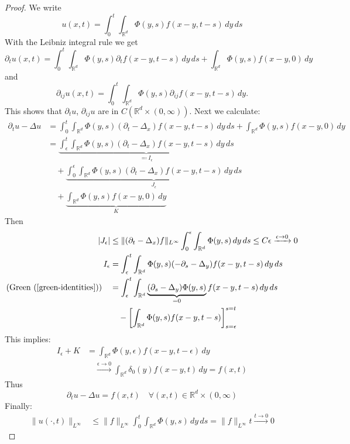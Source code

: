 \documentclass{report}
\theoremstyle{tommy}
\begin{document}
  \begin{proof}
    We write
    \[
      u(x,t) = \int_0^t \int_{\mathbb{R}^d} \Phi(y,s) f(x-y, t-s) \, dy \, ds
    \]
    With the Leibniz integral rule we get
    \[
      \partial_t u(x,t) = \int_0^t \int_{\mathbb{R}^d} \Phi(y,s) \partial_t f(x-y,t-s) \, dy \, ds + \int_{\mathbb{R}^d} \Phi(y,s) f(x-y, 0) \, dy
    \]
    and 
    \[\partial_{ij} u(x,t) = \int_0^t \int_{\mathbb{R}^d} \Phi(y,s) \partial_{ij} f(x-y, t-s) \, dy.\]
    This shows that \(\partial_t u\), \(\partial_{ij} u\) are in \(C(\mathbb{R}^d \times (0, \infty))\). Next we calculate:
    \begin{align*}
      \partial_t u - \Delta u
      &= \int_0^t \int_{\mathbb{R}^d} \Phi(y,s) (\partial_t - \Delta_x) f(x-y, t-s) \, dy \, ds + \int_{\mathbb{R}^d} \Phi(y,s) f(x-y, 0) \, dy \\
      &= \underbrace{\int_\epsilon^t \int_{\mathbb{R}^d} \Phi(y,s) (\partial_t - \Delta_x) f(x-y, t-s) \, dy \, ds}_{\eqqcolon I_\epsilon} \\
      &\quad+ \underbrace{\int_0^\epsilon \int_{\mathbb{R}^d} \Phi(y,s) (\partial_t - \Delta_x) f(x-y, t-s) \, dy \, ds}_{J_\epsilon} \\ 
      &\quad+ \underbrace{\int_{\mathbb{R}^d} \Phi(y,s) f(x-y,0) \, dy}_K
    \end{align*}
    Then
    \begin{align*}
      |J_\epsilon| &\le \|(\partial_t - \Delta_x) f\|_{L^\infty} \int_0^\epsilon \int_{\mathbb{R}^d} \Phi(y,s) \, dy \, ds \le C \epsilon \xrightarrow{\epsilon \to 0} 0 \\
      I_\epsilon &= \int_\epsilon^t \int_{\mathbb{R}^d} \Phi(y,s) (-\partial_s - \Delta_y) f(x-y,t-s) \, dy \, ds \\
      \text{(Green (\ref{green-identities}))}\quad &= \int_{\epsilon}^t \int_{\mathbb{R}^d} \underbrace{(\partial_s - \Delta_y) \Phi(y,s)}_{= 0} f(x-y, t-s) \, dy \, ds \\
      &\quad - \left[\int_{\mathbb{R}^d} \Phi(y,s) f(x-y, t-s)\right]_{s=\epsilon}^{s=t}
    \end{align*}
    This implies:
    \begin{align*}
      I_\epsilon + K 
      &= \int_{\mathbb{R}^d} \Phi(y,\epsilon) f(x-y, t-\epsilon) \, dy \\
      &\quad \xrightarrow{\epsilon \to 0} \int_{\mathbb{R}^d} \delta_0(y) f(x-y, t) \, dy = f(x,t)
    \end{align*}
    Thus
    \[\partial_t u - \Delta u = f(x,t) \quad \forall (x,t) \in \mathbb{R}^d \times (0,\infty)\]
    Finally:
    \begin{align*}
      \|u(\cdot, t)\|_{L^\infty} &\le \|f\|_{L^\infty} \int_0^t \int_{\mathbb{R}^d} \Phi(y,s) \, dy \, ds
      = \|f\|_{L^\infty} t \xrightarrow{t \to 0} 0
    \end{align*}
  \end{proof}
\end{document}
